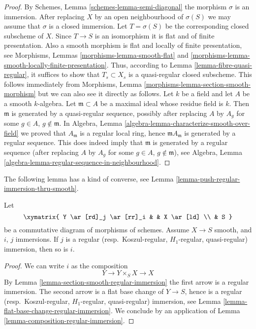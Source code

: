 \begin{proof}
By
Schemes, Lemma \ref{schemes-lemma-semi-diagonal}
the morphism $\sigma$ is an immersion.
After replacing $X$ by an open neighbourhood of $\sigma(S)$
we may assume that $\sigma$ is a closed immersion.
Let $T = \sigma(S)$ be the corresponding closed subscheme of $X$.
Since $T \to S$ is an isomorphism it is flat and of finite presentation.
Also a smooth morphism is flat and locally of finite presentation, see
Morphisms, Lemmas \ref{morphisms-lemma-smooth-flat} and
\ref{morphisms-lemma-smooth-locally-finite-presentation}.
Thus, according to
Lemma \ref{lemma-fibre-quasi-regular},
it suffices to show that $T_s \subset X_s$ is a quasi-regular closed
subscheme. This follows immediately from
Morphisms, Lemma \ref{morphisms-lemma-section-smooth-morphism}
but we can also see it directly as follows.
Let $k$ be a field and let $A$ be a smooth $k$-algebra.
Let $\mathfrak m \subset A$ be a maximal ideal whose residue field is $k$.
Then $\mathfrak m$ is generated by a quasi-regular sequence, possibly
after replacing $A$ by $A_g$ for some $g \in A$, $g \not \in \mathfrak m$.
In
Algebra, Lemma \ref{algebra-lemma-characterize-smooth-over-field}
we proved that $A_{\mathfrak m}$ is a regular local ring,
hence $\mathfrak mA_{\mathfrak m}$ is generated by a regular sequence.
This does indeed imply that $\mathfrak m$ is generated by a
regular sequence (after replacing $A$ by $A_g$ for some $g \in A$,
$g \not \in \mathfrak m$), see
Algebra, Lemma \ref{algebra-lemma-regular-sequence-in-neighbourhood}.
\end{proof}

\noindent
The following lemma has a kind of converse, see
Lemma \ref{lemma-push-regular-immersion-thru-smooth}.

\begin{lemma}
\label{lemma-lift-regular-immersion-to-smooth}
Let
$$
\xymatrix{
Y \ar[rd]_j \ar[rr]_i & & X \ar[ld] \\
& S
}
$$
be a commutative diagram of morphisms of schemes.
Assume $X \to S$ smooth, and $i$, $j$ immersions.
If $j$ is a regular (resp.\ Koszul-regular, $H_1$-regular, quasi-regular)
immersion, then so is $i$.
\end{lemma}

\begin{proof}
We can write $i$ as the composition
$$
Y \to Y \times_S X \to X
$$
By
Lemma \ref{lemma-section-smooth-regular-immersion}
the first arrow is a regular immersion.
The second arrow is a flat base change of $Y \to S$, hence is a
regular (resp.\ Koszul-regular, $H_1$-regular, quasi-regular) immersion, see
Lemma \ref{lemma-flat-base-change-regular-immersion}.
We conclude by an application of
Lemma \ref{lemma-composition-regular-immersion}.
\end{proof}

